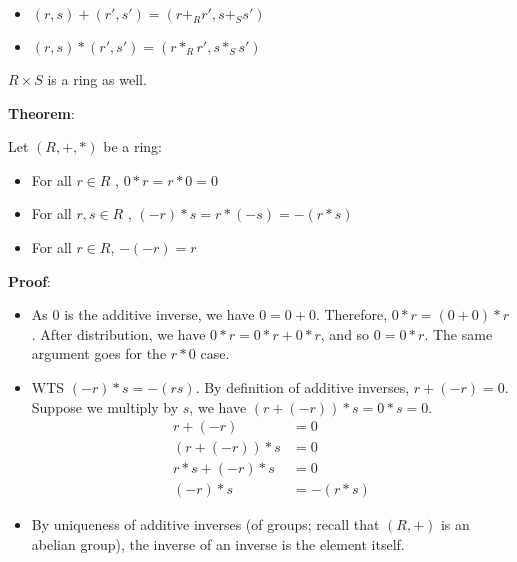 \documentclass{article}
\begin{document}
\begin{multicols*}{2}
\begin{itemize}
    \item $(r, s) + (r', s') = (r +_R r', s +_S s')$
    \item$(r, s) * (r', s') = (r *_R r', s *_S s')$
\end{itemize}

$R \times S$ is a ring as well.

\textbf{Theorem}:

Let $(R, +, *)$ be a ring:

\begin{itemize}
    \item[(1)] For all $r \in R$ , $0 * r = r * 0 = 0$
    \item[(2)] For all $r, s \in R$ , $(-r)*s = r*(-s) = -(r*s)$
    \item[(3)] For all $r \in R$, $-(-r) = r$
\end{itemize}

\textbf{Proof}:

\begin{itemize}
    \item[(1)] As $0$ is the additive inverse, we have $0 = 0 + 0$. Therefore, $0*r = (0 + 0)*r$. After distribution, we have $0*r = 0*r + 0*r$, and so $0 = 0*r$. The same argument goes for the $r * 0$ case.
    \item[(2)] WTS $(-r)*s = -(rs)$. By definition of additive inverses, $r + (-r) = 0$. Suppose we multiply by $s$, we have $(r + (-r))*s = 0 *s = 0$.\[\begin{aligned}
        r + (-r) &= 0\\
        (r + (-r)) * s &= 0\\
        r*s + (-r) * s &= 0\\
        (-r) * s &= -(r*s)
    \end{aligned}\]
    \item[(3)] By uniqueness of additive inverses (of groups; recall that $(R,+)$ is an abelian group), the inverse of an inverse is the element itself.
\end{itemize}


\end{multicols*}
\end{document}
